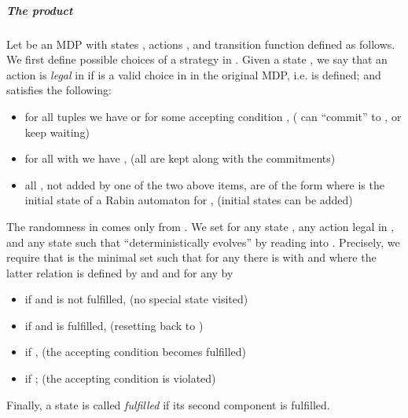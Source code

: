 \documentclass[a4paper,UKenglish]{lipics}
\begin{document}
\subparagraph{The product}
Let  be an MDP with states ,
actions
, and transition function  defined as follows.
We first define possible choices of a strategy in . Given a state , we say that an action  is \emph{legal} in  if
 is a valid choice in  in the original MDP, i.e.  is defined; and  satisfies the following:
\begin{itemize}
	\item for all tuples  we have  or  for some accepting condition ,
	{\footnotesize ( can ``commit'' to , or keep waiting)}
	\item for all  with  we have , {\footnotesize (all  are kept along with the commitments)}
	\item all , not added by one of the two above items, are of the form  where  is the initial state of a Rabin automaton  for , {\footnotesize (initial states can be added)}
\end{itemize}


\noindent
\label{page:det-evolv}The randomness in  comes only from . We set 
for any state , any action  legal in , and any state  such that  ``deterministically evolves'' by reading  into . 
Precisely, we require that  is the minimal set such that for any  there is  with  and  where the latter relation is defined by  and   and for any  by
\begin{itemize}
	\item  if  and  is not fulfilled, {\footnotesize (no special state visited)}
	\item  if  and  is fulfilled, {\footnotesize (resetting back to )}
	\item   if , {\footnotesize (the accepting condition becomes fulfilled)} 
	\item  if ; {\footnotesize (the accepting condition is violated)} 
\end{itemize}

\noindent
Finally, a state is called {\em fulfilled} if its second component is fulfilled.
\end{document}
